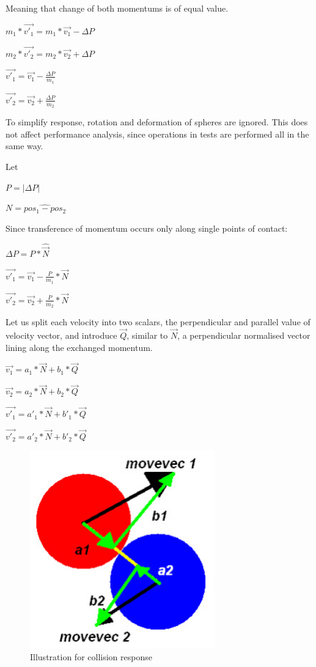 Meaning that change of both momentums is of equal value.
\begin{center}
$m_1*\vec{v'_1} =  m_1*\vec{v_1} - \Delta P$

$m_2*\vec{v'_2} =  m_2*\vec{v_2} + \Delta P$

$\vec{v'_1} =  \vec{v_1} - \frac{\Delta P}{m_1}$

$\vec{v'_2} =  \vec{v_2} + \frac{\Delta P}{m_2}$
\end{center}

To simplify response, rotation and deformation of spheres are ignored. This does not affect performance analysis, since operations in tests are performed all in the same way.

Let
\begin{center}
$P = |\Delta P|$

$N = \hat{pos_1 - pos_2}$
\end{center}

Since transference of momentum occurs only along single points of contact:
\begin{center}
$ \Delta P = P * \hat{\vec{N}}$

$\vec{v'_1} =  \vec{v_1} - \frac{P}{m_1} * \vec{N}$

$\vec{v'_2} =  \vec{v_2} + \frac{P}{m_2} * \vec{N}$
\end{center}

Let us split each velocity into two scalars, the perpendicular and parallel value of velocity vector, and introduce $\vec{Q}$, similar to $\vec{N}$, a perpendicular normalised vector lining along the exchanged momentum.

 \begin{center}
$\vec{v_1} =  a_1 * \vec{N} + b_1 * \vec{Q}$

$\vec{v_2} =  a_2 * \vec{N} + b_2 * \vec{Q}$

$\vec{v'_1} =  a'_1 * \vec{N} + b'_1 * \vec{Q}$

$\vec{v'_2} =  a'_2 * \vec{N} + b'_2 * \vec{Q}$
\end{center}

\begin{figure}[h!]
  \caption{Illustration for collision response}
  \label{img:spheresbounce}
  \centering
	\includegraphics[width=8cm]{spheres/bounce.jpg}
\end{figure} 

